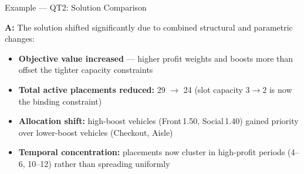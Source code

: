 \documentclass[aspectratio=169,10pt]{beamer}
\begin{document}
\begin{frame}[t]{Example — QT2: Solution Comparison}
\vspace{2pt}
\vspace{4pt}
\small\textbf{\textcolor{lgrn}{A:}}\;
The solution shifted significantly due to combined structural and parametric changes:
\vspace{2pt}
\footnotesize
\begin{itemize}\setlength\itemsep{3pt}
  \item \textbf{Objective value increased} --- higher profit weights and boosts
        more than offset the tighter capacity constraints
  \item \textbf{Total active placements reduced:} 29 $\to$ 24
        \textcolor{mgray}{(slot capacity 3$\to$2 is now the binding constraint)}
  \item \textbf{Allocation shift:} high-boost vehicles (Front\,1.50, Social\,1.40)
        gained priority over lower-boost vehicles (Checkout, Aisle)
  \item \textbf{Temporal concentration:} placements now cluster in high-profit
        periods (4--6, 10--12) rather than spreading uniformly
\end{itemize}
\vspace{4pt}
\end{frame}
\end{document}
